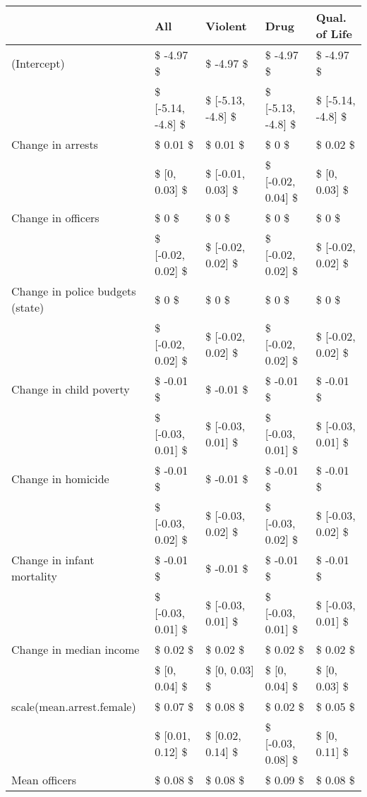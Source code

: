 \begin{table}[ht]
\centering
\begin{tabular}{lllll}
  \hline
  & All & Violent & Drug & Qual. of Life \\ 
  \hline
(Intercept) & \$ -4.97 \$ & \$ -4.97 \$ & \$ -4.97 \$ & \$ -4.97 \$ \\ 
   & \$ [-5.14, -4.8] \$ & \$ [-5.13, -4.8] \$ & \$ [-5.13, -4.8] \$ & \$ [-5.14, -4.8] \$ \\ 
  Change in arrests & \$ 0.01 \$ & \$ 0.01 \$ & \$ 0 \$ & \$ 0.02 \$ \\ 
   & \$ [0, 0.03] \$ & \$ [-0.01, 0.03] \$ & \$ [-0.02, 0.04] \$ & \$ [0, 0.03] \$ \\ 
  Change in officers & \$ 0 \$ & \$ 0 \$ & \$ 0 \$ & \$ 0 \$ \\ 
   & \$ [-0.02, 0.02] \$ & \$ [-0.02, 0.02] \$ & \$ [-0.02, 0.02] \$ & \$ [-0.02, 0.02] \$ \\ 
  Change in police budgets (state) & \$ 0 \$ & \$ 0 \$ & \$ 0 \$ & \$ 0 \$ \\ 
   & \$ [-0.02, 0.02] \$ & \$ [-0.02, 0.02] \$ & \$ [-0.02, 0.02] \$ & \$ [-0.02, 0.02] \$ \\ 
  Change in child poverty & \$ -0.01 \$ & \$ -0.01 \$ & \$ -0.01 \$ & \$ -0.01 \$ \\ 
   & \$ [-0.03, 0.01] \$ & \$ [-0.03, 0.01] \$ & \$ [-0.03, 0.01] \$ & \$ [-0.03, 0.01] \$ \\ 
  Change in homicide & \$ -0.01 \$ & \$ -0.01 \$ & \$ -0.01 \$ & \$ -0.01 \$ \\ 
   & \$ [-0.03, 0.02] \$ & \$ [-0.03, 0.02] \$ & \$ [-0.03, 0.02] \$ & \$ [-0.03, 0.02] \$ \\ 
  Change in infant mortality & \$ -0.01 \$ & \$ -0.01 \$ & \$ -0.01 \$ & \$ -0.01 \$ \\ 
   & \$ [-0.03, 0.01] \$ & \$ [-0.03, 0.01] \$ & \$ [-0.03, 0.01] \$ & \$ [-0.03, 0.01] \$ \\ 
  Change in median income & \$ 0.02 \$ & \$ 0.02 \$ & \$ 0.02 \$ & \$ 0.02 \$ \\ 
   & \$ [0, 0.04] \$ & \$ [0, 0.03] \$ & \$ [0, 0.04] \$ & \$ [0, 0.03] \$ \\ 
  scale(mean.arrest.female) & \$ 0.07 \$ & \$ 0.08 \$ & \$ 0.02 \$ & \$ 0.05 \$ \\ 
   & \$ [0.01, 0.12] \$ & \$ [0.02, 0.14] \$ & \$ [-0.03, 0.08] \$ & \$ [0, 0.11] \$ \\ 
  Mean officers & \$ 0.08 \$ & \$ 0.08 \$ & \$ 0.09 \$ & \$ 0.08 \$ \\ 

\end{tabular}
\end{table}

